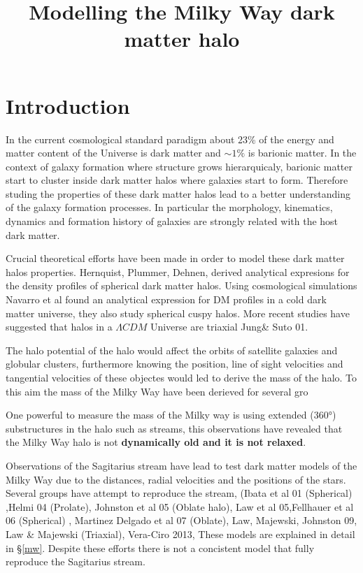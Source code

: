 \documentclass[12pt]{article}
\title{\begin{LARGE}
{Modelling the Milky Way dark matter halo}
\end{LARGE}}
\begin{document}
\maketitle

\section{Introduction}

In the current cosmological standard paradigm about 23\% of the energy and matter
content of the Universe is dark matter and $\sim 1\%$ is barionic matter. In the
context of galaxy formation where structure grows hierarquicaly, barionic matter
start to cluster inside dark matter halos where galaxies start to form. Therefore
studing the properties of these dark matter halos lead to a better understanding
of the galaxy formation processes. In particular the morphology, kinematics, dynamics
and formation history of galaxies are strongly related with the host dark matter. 

     
Crucial theoretical efforts have been made in order to model these dark matter halos 
properties. Hernquist, Plummer, Dehnen, derived analytical expresions for the density 
profiles of spherical dark matter halos. Using cosmological simulations Navarro et al 
found an analytical expression for DM profiles in a cold dark matter universe, they also 
study spherical cuspy halos. More recent studies have suggested that halos in a 
$\Lambda CDM$ Universe are triaxial Jung\& Suto 01.   

The halo potential of the halo would affect the orbits of satellite galaxies and globular 
clusters, furthermore knowing the position, line of sight velocities and tangential velocities
of these objectes would led to derive the mass of the halo. To this aim the mass of the Milky 
Way have been derieved for several gro


One powerful to measure the mass of the Milky way is using extended (360$°$) substructures
in the halo such as streams, this observations have revealed that the Milky Way
halo is not \textbf{dynamically old and it is not relaxed}.


Observations of the Sagitarius stream \citep{ibata01} have lead to test dark matter models of 
the Milky Way due to the distances, radial velocities and the positions of
the stars. Several groups have attempt to reproduce the stream, (Ibata et al 01 (Spherical)
,Helmi 04 (Prolate), Johnston et al 05 (Oblate halo), Law et al 05,Fellhauer et al 06 (Spherical)
, Martinez Delgado et al 07 (Oblate), Law, Majewski, Johnston 09, Law \& Majewski (Triaxial), 
Vera-Ciro 2013, These models are explained in detail in \S \ref{mw}. Despite these efforts
there is not a concistent model that fully reproduce the Sagitarius stream.  
\end{document}
